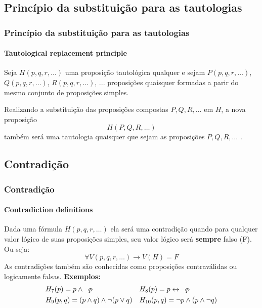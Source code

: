 \subsection{Princípio da substituição para as tautologias}
%
\begin{frame}[t]
    \frametitle{Princípio da substituição para as tautologias}
    \framesubtitle{Tautological replacement principle}
    \begin{tcolorbox}[colback=blue!5,colframe=blue!60!black,adjusted title=Definição]
        \indent Seja $H(p,q,r,\dots)$ uma proposição tautológica qualquer e sejam $P(p,q,r,\dots)$, $Q(p,q,r,\dots)$, $R(p,q,r,\dots)$, ... proposições quaisquer formadas a parir do mesmo conjunto de proposições simples.
        
        \tcblower
        
        Realizando a substituição das proposições compostas $P, Q, R, \dots$ em $H$, a nova proposição $$ H(P,Q,R,\dots)$$ também será uma tautologia quaisquer que sejam as proposições $P, Q, R, \dots$ .
    \end{tcolorbox}
\end{frame}
%
\subsection{Contradição}
%
\begin{frame}[t]
    \frametitle{Contradição}
    \framesubtitle{Contradiction definitions}
    \begin{tcolorbox}[colback=red!5!white,colframe=red!75!black,title=Definição]
        Dada uma fórmula $H(p,q,r,\dots)$ ela será uma contradição quando para qualquer valor lógico de suas proposições simples, seu valor lógico será \textbf{sempre} falso (F). Ou seja:
        $$ \forall V(p,q,r,\dots) \to V(H)=F$$
        As contradições também são conhecidas como proposições contraválidas ou logicamente falsas.
        \tcblower
        \textbf{Exemplos:}
        \begin{align*}
            &H_7(p) = p \land \lnot p                     &        & H_8(p) = p \leftrightarrow \lnot p \\
            &H_9(p,q) = (p \land q) \land \lnot (p \lor q)    &        & H_{10}(p,q) = \lnot p \land (p \land \lnot q)
        \end{align*}
    \end{tcolorbox}
\end{frame}
%
